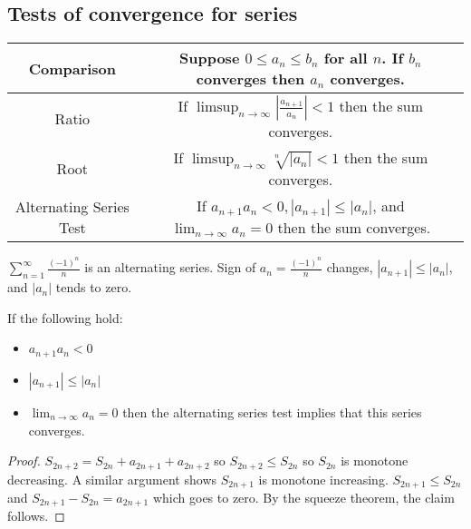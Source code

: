 \documentclass{article}
\newcommand{\ra}[1][]{\xrightarrow{#1}}
\begin{document}
\subsection{Tests of convergence for series}
\begin{tabular}{|c|c|}
\hline
Comparison & Suppose $0\leq a_n\leq b_n$ for all $n$. If $b_n$ converges then $a_n$ converges. \\
\hline
Ratio & If $\limsup_{n\ra\infty}|\frac{a_{n+1}}{a_n}|<1$ then the sum converges.\\
\hline
Root & If $\limsup_{n\ra\infty}\sqrt[n]{|a_n|}<1$ then the sum converges.\\
\hline
Alternating Series Test & If $a_{n+1}a_n<0,|a_{n+1}|\leq|a_n|$, and $\lim_{n\ra\infty}a_n=0$ then the sum converges. \\
\hline
\end{tabular}
\begin{example}
$\sum_{n=1}^\infty \frac{(-1)^n}{n}$ is an alternating series. Sign of $a_n=\frac{(-1)^n}{n}$ changes, $|a_{n+1}|\leq |a_n|$, and $|a_n|$ tends to zero.
\end{example}
\begin{definition}
If the following hold:
\begin{itemize}
\item $a_{n+1}a_n<0$
\item $|a_{n+1}|\leq |a_n|$
\item $\lim_{n\ra\infty}a_n=0$
then the alternating series test implies that this series converges.
\end{itemize}
\end{definition}
\begin{proof}
$S_{2n+2}=S_{2n}+a_{2n+1}+a_{2n+2}$ so $S_{2n+2}\leq S_{2n}$ so $S_{2n}$ is monotone decreasing. A similar argument shows $S_{2n+1}$ is monotone increasing. $S_{2n+1}\leq S_{2n}$ and $S_{2n+1}-S_{2n}=a_{2n+1}$ which goes to zero. By the squeeze theorem, the claim follows.
\end{proof}
\end{document}
